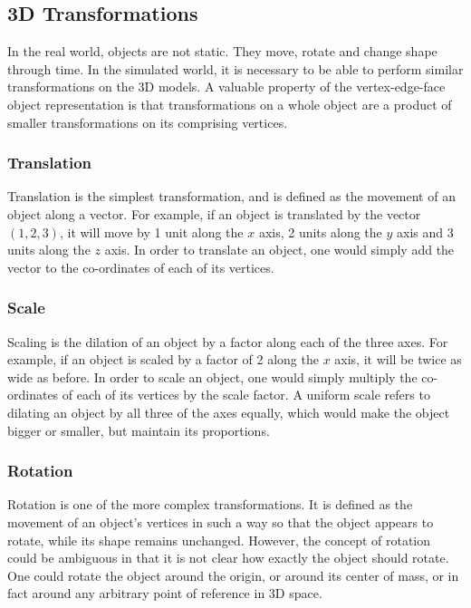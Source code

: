 \documentclass[12pt, a4paper]{article}
\begin{document}

\subsection{3D Transformations}
In the real world, objects are not static. They move, rotate and change shape
through time. In the simulated world, it is necessary to be able to perform
similar transformations on the 3D models. A valuable property of the
vertex-edge-face object representation is that transformations on a whole
object are a product of smaller transformations on its comprising vertices. \\

\subsubsection{Translation}
Translation is the simplest transformation, and is defined as the movement of an
object along a vector. For example, if an object is translated by the vector
$(1, 2, 3)$, it will move by 1 unit along the $x$ axis, 2 units along the $y$
axis and 3 units along the $z$ axis. In order to translate an object, one would
simply add the vector to the co-ordinates of each of its vertices. \\

\subsubsection{Scale}
Scaling is the dilation of an object by a factor along each of the three axes.
For example, if an object is scaled by a factor of 2 along the $x$ axis, it will
be twice as wide as before. In order to scale an object, one would simply
multiply the co-ordinates of each of its vertices by the scale factor. A uniform
scale refers to dilating an object by all three of the axes equally, which would
make the object bigger or smaller, but maintain its proportions. \\

\subsubsection{Rotation}
Rotation is one of the more complex transformations. It is defined as the
movement of an object's vertices in such a way so that the object appears to
rotate, while its shape remains unchanged. However, the concept of rotation
could be ambiguous in that it is not clear how exactly the object should rotate.
One could rotate the object around the origin, or around its center of mass, or
in fact around any arbitrary point of reference in 3D space. \\
\end{document}
